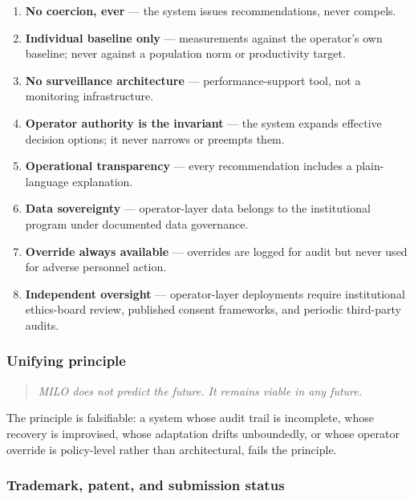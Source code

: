 \begin{enumerate}
\def\labelenumi{\arabic{enumi}.}
\tightlist
\item
  \textbf{No coercion, ever} --- the system issues recommendations,
  never compels.
\item
  \textbf{Individual baseline only} --- measurements against the
  operator's own baseline; never against a population norm or
  productivity target.
\item
  \textbf{No surveillance architecture} --- performance-support tool,
  not a monitoring infrastructure.
\item
  \textbf{Operator authority is the invariant} --- the system expands
  effective decision options; it never narrows or preempts them.
\item
  \textbf{Operational transparency} --- every recommendation includes a
  plain-language explanation.
\item
  \textbf{Data sovereignty} --- operator-layer data belongs to the
  institutional program under documented data governance.
\item
  \textbf{Override always available} --- overrides are logged for audit
  but never used for adverse personnel action.
\item
  \textbf{Independent oversight} --- operator-layer deployments require
  institutional ethics-board review, published consent frameworks, and
  periodic third-party audits.
\end{enumerate}

\subsubsection{Unifying principle}\label{unifying-principle}

\begin{quote}
\emph{MILO does not predict the future. It remains viable in any
future.}
\end{quote}

The principle is falsifiable: a system whose audit trail is incomplete,
whose recovery is improvised, whose adaptation drifts unboundedly, or
whose operator override is policy-level rather than architectural, fails
the principle.

\subsubsection{Trademark, patent, and submission
status}\label{trademark-patent-and-submission-status}

